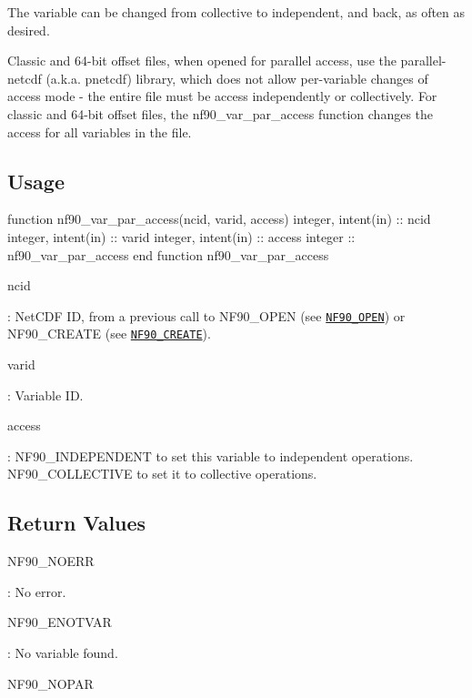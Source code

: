 The variable can be changed from collective to independent, and back, as often as desired.

Classic and 64-\/bit offset files, when opened for parallel access, use the parallel-\/netcdf (a.\+k.\+a. pnetcdf) library, which does not allow per-\/variable changes of access mode -\/ the entire file must be access independently or collectively. For classic and 64-\/bit offset files, the nf90\+\_\+var\+\_\+par\+\_\+access function changes the access for all variables in the file.

\subsection*{Usage}


\begin{DoxyCode}
\textcolor{keyword}{function }nf90\_var\_par\_access(ncid, varid, access)
  \textcolor{keywordtype}{integer}, \textcolor{keywordtype}{intent(in)} :: ncid
  \textcolor{keywordtype}{integer}, \textcolor{keywordtype}{intent(in)} :: varid
  \textcolor{keywordtype}{integer}, \textcolor{keywordtype}{intent(in)} :: access
  \textcolor{keywordtype}{integer} :: nf90\_var\_par\_access
\textcolor{keyword}{end function }nf90\_var\_par\_access
\end{DoxyCode}


{\ttfamily ncid}

\+: Net\+C\+DF ID, from a previous call to N\+F90\+\_\+\+O\+P\+EN (see \href{#NF90_005fOPEN}{\tt N\+F90\+\_\+\+O\+P\+EN}) or N\+F90\+\_\+\+C\+R\+E\+A\+TE (see \href{#NF90_005fCREATE}{\tt N\+F90\+\_\+\+C\+R\+E\+A\+TE}).

{\ttfamily varid}

\+: Variable ID.

{\ttfamily access}

\+: N\+F90\+\_\+\+I\+N\+D\+E\+P\+E\+N\+D\+E\+NT to set this variable to independent operations. N\+F90\+\_\+\+C\+O\+L\+L\+E\+C\+T\+I\+VE to set it to collective operations.

\subsection*{Return Values}

{\ttfamily N\+F90\+\_\+\+N\+O\+E\+RR}

\+: No error.

{\ttfamily N\+F90\+\_\+\+E\+N\+O\+T\+V\+AR}

\+: No variable found.

{\ttfamily N\+F90\+\_\+\+N\+O\+P\+AR}

